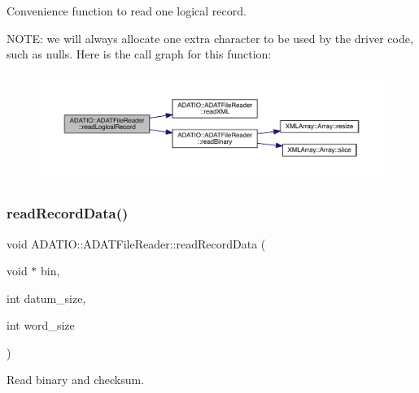 Convenience function to read one logical record. 

N\+O\+TE\+: we will always allocate one extra character to be used by the driver code, such as nulls. Here is the call graph for this function\+:\nopagebreak
\begin{figure}[H]
\begin{center}
\leavevmode
\includegraphics[width=350pt]{db/de5/group__qio_ga7d36d6dd7fef90986d0c435ddaa86eae_cgraph}
\end{center}
\end{figure}
\mbox{\label{group__qio_ga525c9902a7ee7ebe41c688897da0652e}} 
\subsubsection{\texorpdfstring{readRecordData()}{readRecordData()}}
{\footnotesize\ttfamily void A\+D\+A\+T\+I\+O\+::\+A\+D\+A\+T\+File\+Reader\+::read\+Record\+Data (\begin{DoxyParamCaption}\item[{void $\ast$}]{bin,  }\item[{int}]{datum\+\_\+size,  }\item[{int}]{word\+\_\+size }\end{DoxyParamCaption})\hspace{0.3cm}{\ttfamily [protected]}}



Read binary and checksum. 

